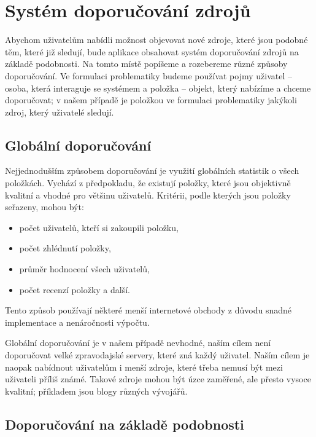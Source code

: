 \chapter{Systém doporučování zdrojů}

Abychom uživatelům nabídli možnost objevovat nové zdroje, které jsou podobné těm, které již sledují, bude aplikace obsahovat systém doporučování zdrojů na základě podobnosti.
Na tomto místě popíšeme a rozebereme různé způsoby doporučování.
Ve formulaci problematiky budeme používat pojmy uživatel -- osoba, která interaguje se systémem a položka -- objekt, který nabízíme a chceme doporučovat; v našem případě je položkou ve formulaci problematiky jakýkoli zdroj, který uživatelé sledují.

\section{Globální doporučování}

Nejjednodušším způsobem doporučování je využití globálních statistik o všech položkách.
Vychází z předpokladu, že existují položky, které jsou objektivně kvalitní a vhodné pro většinu uživatelů.
Kritérii, podle kterých jsou položky seřazeny, mohou být:
\begin{itemize}
    \item počet uživatelů, kteří si zakoupili položku,
    \item počet zhlédnutí položky,
    \item průměr hodnocení všech uživatelů,
	\item počet recenzí položky a další.
\end{itemize}
Tento způsob používají některé menší internetové obchody z důvodu snadné implementace a nenáročnosti výpočtu.

Globální doporučování je v našem případě nevhodné, naším cílem není doporučovat velké zpravodajské servery, které zná každý uživatel.
Naším cílem je naopak nabídnout uživatelům i menší zdroje, které třeba nemusí být mezi uživateli příliš známé.
Takové zdroje mohou být úzce zaměřené, ale přesto vysoce kvalitní; příkladem jsou blogy různých vývojářů.

\section{Doporučování na základě podobnosti}


